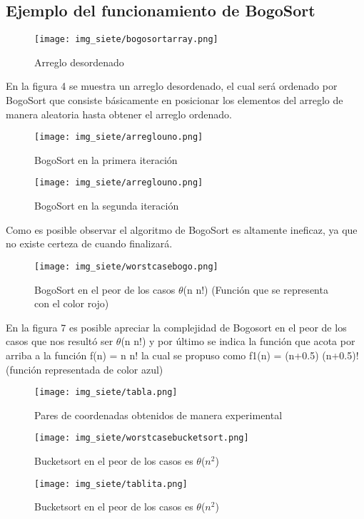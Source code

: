 \documentclass[12pt,twoside]{article}
\begin{document}
\subsection*{Ejemplo del funcionamiento de BogoSort}
\newline
\begin{figure}[H]
\centering
\texttt{[image: img\_siete/bogosortarray.png]}
\caption{Arreglo desordenado}
\end{figure}
En la figura 4 se muestra un arreglo desordenado, el cual será ordenado por BogoSort que consiste básicamente en posicionar los elementos del arreglo de manera aleatoria hasta obtener el arreglo ordenado.
\begin{figure}[H]
\centering
\texttt{[image: img\_siete/arreglouno.png]}
\caption{BogoSort en la primera iteración}
\end{figure}
\begin{figure}[H]
\centering
\texttt{[image: img\_siete/arreglouno.png]}
\caption{BogoSort en la segunda iteración}
\end{figure}
Como es posible observar el algoritmo de BogoSort es altamente ineficaz, ya que no existe certeza de cuando finalizará.
\vspace{10mm}
\begin{figure}[H]
\centering
\texttt{[image: img\_siete/worstcasebogo.png]}
\caption{BogoSort en el peor de los casos $\theta$(n n!) (Función que se representa con el color rojo)}
\end{figure}
En la figura 7 es posible apreciar la complejidad de Bogosort en el peor de los casos que nos resultó ser $\theta$(n n!) y por último se indica la función que acota por arriba a la función f(n) = n n! la cual se propuso como f1(n) = (n+0.5) (n+0.5)! (función representada de color azul)
\begin{figure}[H]
\centering
\texttt{[image: img\_siete/tabla.png]}
\caption{Pares de coordenadas obtenidos de manera experimental}
\end{figure}
\vspace{10 mm}
\begin{figure}[H]
\centering
\texttt{[image: img\_siete/worstcasebucketsort.png]}
\caption{Bucketsort en el peor de los casos es $\theta$($n^2$)}
\end{figure}
\vspace{10 mm}
\begin{figure}[H]
\centering
\texttt{[image: img\_siete/tablita.png]}
\caption{Bucketsort en el peor de los casos es $\theta$($n^2$)}
\end{figure}
\end{document}
